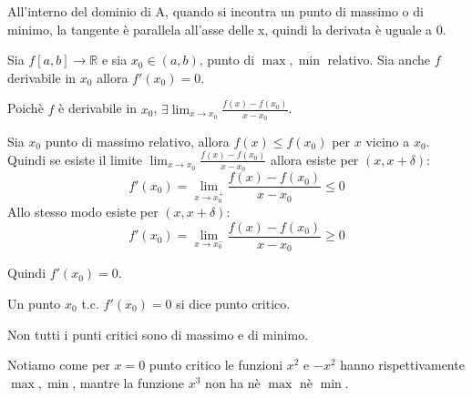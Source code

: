 All'interno del dominio di A, quando si incontra un punto di massimo o di minimo, la tangente è parallela all'asse delle x, quindi la derivata è uguale a 0.

\begin{thm}
    Sia $f[a,b]\to\mathbb{R}$ e sia $x_0\in(a,b)$, punto di $\max, \min$ relativo. Sia anche $f$ derivabile in $x_0$ allora $f'(x_0)=0$.
    \begin{dimostration}
        Poichè $f$ è derivabile in $x_0$, $\exists\lim_{x\to x_0}\frac{f(x)-f(x_0)}{x-x_0}$.
        
        Sia $x_0$ punto di massimo relativo, allora $f(x)\leq f(x_0)$ per $x$ vicino a $x_0$.
        Quindi se esiste il limite $\lim_{x\to x_0}\frac{f(x)-f(x_0)}{x-x_0}$ allora esiste per $(x,x+\delta)$:
        \begin{equation*}
            f'(x_0)=\lim_{x\to x_0^+}\frac{f(x)-f(x_0)}{x-x_0}\leq0
        \end{equation*}
        Allo stesso modo esiste per $(x,x+\delta)$:
        \begin{equation*}
            f'(x_0)=\lim_{x\to x_0^-}\frac{f(x)-f(x_0)}{x-x_0}\geq0
        \end{equation*}
        
        Quindi $f'(x_0)=0$.
    \end{dimostration}
\end{thm}

\begin{definition}
    Un punto $x_0$ t.c. $f'(x_0)=0$ si dice punto critico.
    \begin{osservation}
        Non tutti i punti critici sono di massimo e di minimo.
        
        
        Notiamo come per $x=0$ punto critico le funzioni $x^2$ e $-x^2$ hanno rispettivamente $\max, \min$, mantre la funzione $x^3$ non ha nè $\max$ nè $\min$.
    \end{osservation}
\end{definition}

